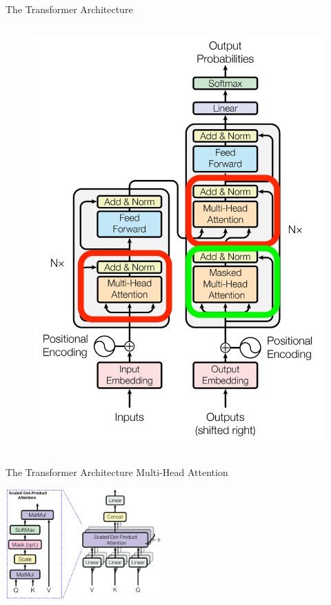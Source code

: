 \documentclass[aspectratio=169]{beamer}
\begin{document}
\begin{frame}{The Transformer Architecture}
\begin{columns}
\begin{column}{0.5\textwidth}
\begin{center}
\begin{figure}
\begin{overprint}
	 \includegraphics[height=\paperheight]{figures/transformer_multihead_attn}
    \end{overprint}
    \end{figure}
    \end{center}
\end{column}
\end{columns}
\end{frame}

\begin{frame}{The Transformer Architecture}
\centering
Multi-Head Attention
\vspace{.5cm}

\includegraphics[width=0.45\textwidth]{figures/multihead_attn}

\end{frame}
\end{document}
